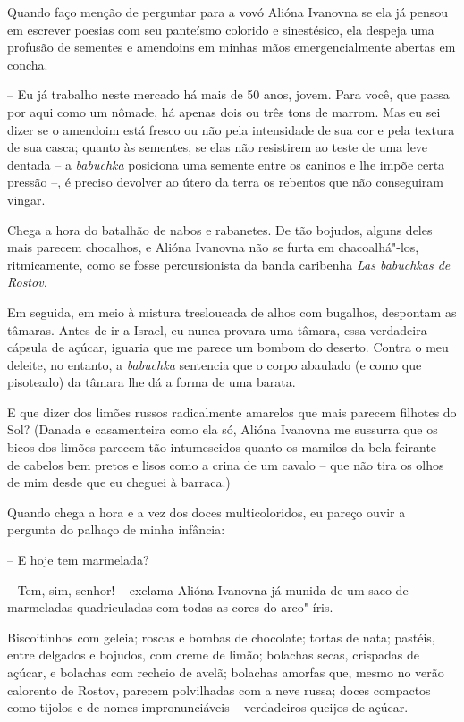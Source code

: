 Quando faço menção de perguntar para a vovó Alióna Ivanovna se ela já
pensou em escrever poesias com seu panteísmo colorido e sinestésico, ela
despeja uma profusão de sementes e amendoins em minhas mãos
emergencialmente abertas em concha.

-- Eu já trabalho neste mercado há mais de 50 anos, jovem. Para você,
que passa por aqui como um nômade, há apenas dois ou três tons de
marrom. Mas eu sei dizer se o amendoim está fresco ou não pela
intensidade de sua cor e pela textura de sua casca; quanto às sementes,
se elas não resistirem ao teste de uma leve dentada -- a \emph{babuchka}
posiciona uma semente entre os caninos e lhe impõe certa pressão --, é
preciso devolver ao útero da terra os rebentos que não conseguiram
vingar.

Chega a hora do batalhão de nabos e rabanetes. De tão bojudos, alguns
deles mais parecem chocalhos, e Alióna Ivanovna não se furta em
chacoalhá"-los, ritmicamente, como se fosse percursionista da banda
caribenha \emph{Las babuchkas de Rostov. }

Em seguida, em meio à mistura tresloucada de alhos com bugalhos,
despontam as tâmaras. Antes de ir a Israel, eu nunca provara uma tâmara,
essa verdadeira cápsula de açúcar, iguaria que me parece um bombom do
deserto. Contra o meu deleite, no entanto, a \emph{babuchka} sentencia
que o corpo abaulado (e como que pisoteado) da tâmara lhe dá a forma de
uma barata.

E que dizer dos limões russos radicalmente amarelos que mais parecem
filhotes do Sol? (Danada e casamenteira como ela só, Alióna Ivanovna me
sussurra que os bicos dos limões parecem tão intumescidos quanto os
mamilos da bela feirante -- de cabelos bem pretos e lisos como a crina
de um cavalo -- que não tira os olhos de mim desde que eu cheguei à
barraca.)

Quando chega a hora e a vez dos doces multicoloridos, eu pareço ouvir a
pergunta do palhaço de minha infância:

-- E hoje tem marmelada?

-- Tem, sim, senhor! -- exclama Alióna Ivanovna já munida de um saco de
marmeladas quadriculadas com todas as cores do arco"-íris.

Biscoitinhos com geleia; roscas e bombas de chocolate; tortas de nata;
pastéis, entre delgados e bojudos, com creme de limão; bolachas secas,
crispadas de açúcar, e bolachas com recheio de avelã; bolachas amorfas
que, mesmo no verão calorento de Rostov, parecem polvilhadas com a neve
russa; doces compactos como tijolos e de nomes impronunciáveis --
verdadeiros queijos de açúcar.

